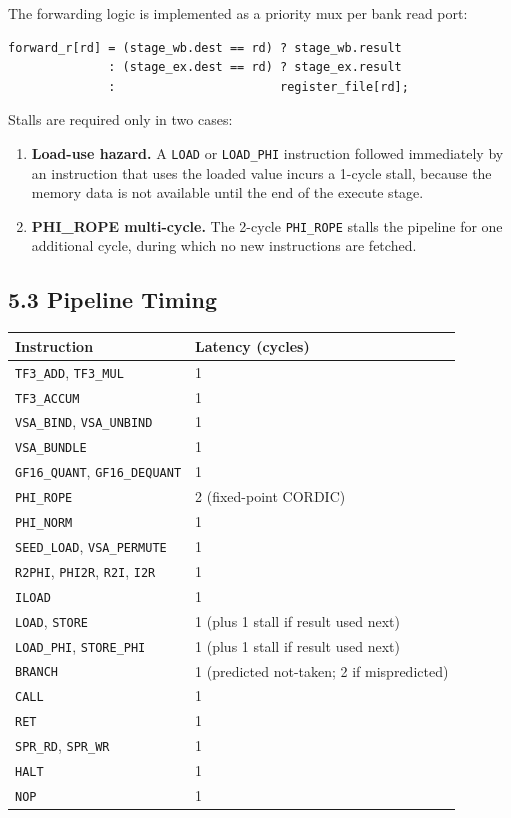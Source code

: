 The forwarding logic is implemented as a priority mux per bank
read port:

\begin{verbatim}
forward_r[rd] = (stage_wb.dest == rd) ? stage_wb.result
              : (stage_ex.dest == rd) ? stage_ex.result
              :                       register_file[rd];
\end{verbatim}

Stalls are required only in two cases:

\begin{enumerate}
\def\labelenumi{\arabic{enumi}.}
\item
  \textbf{Load-use hazard.} A \texttt{LOAD} or
  \texttt{LOAD\_PHI} instruction followed immediately by
  an instruction that uses the loaded value incurs a 1-cycle
  stall, because the memory data is not available until the
  end of the execute stage.
\item
  \textbf{PHI\_ROPE multi-cycle.} The 2-cycle
  \texttt{PHI\_ROPE} stalls the pipeline for one additional
  cycle, during which no new instructions are fetched.
\end{enumerate}

\subsection{5.3 Pipeline Timing}\label{fa_71:pipeline-timing}

\begin{longtable}[]{@{}ll@{}}
\toprule\noalign{}
Instruction & Latency (cycles) \\
\midrule\noalign{}
\endhead
\bottomrule\noalign{}
\endlastfoot
\texttt{TF3\_ADD}, \texttt{TF3\_MUL} & 1 \\
\texttt{TF3\_ACCUM} & 1 \\
\texttt{VSA\_BIND}, \texttt{VSA\_UNBIND} & 1 \\
\texttt{VSA\_BUNDLE} & 1 \\
\texttt{GF16\_QUANT}, \texttt{GF16\_DEQUANT} & 1 \\
\texttt{PHI\_ROPE} & 2 (fixed-point CORDIC) \\
\texttt{PHI\_NORM} & 1 \\
\texttt{SEED\_LOAD}, \texttt{VSA\_PERMUTE} & 1 \\
\texttt{R2PHI}, \texttt{PHI2R}, \texttt{R2I}, \texttt{I2R} & 1 \\
\texttt{ILOAD} & 1 \\
\texttt{LOAD}, \texttt{STORE} & 1 (plus 1 stall if result used next) \\
\texttt{LOAD\_PHI}, \texttt{STORE\_PHI} & 1 (plus 1 stall if result used next) \\
\texttt{BRANCH} & 1 (predicted not-taken; 2 if mispredicted) \\
\texttt{CALL} & 1 \\
\texttt{RET} & 1 \\
\texttt{SPR\_RD}, \texttt{SPR\_WR} & 1 \\
\texttt{HALT} & 1 \\
\texttt{NOP} & 1 \\
\end{longtable}

